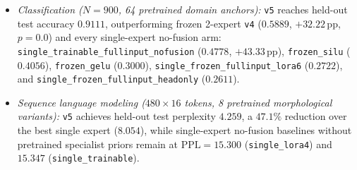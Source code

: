 \documentclass[10pt]{article}
\theoremstyle{definition}
\theoremstyle{plain}
\theoremstyle{remark}
\begin{document}
\begin{enumerate}[leftmargin=1.6em, itemsep=1pt, parsep=0pt]
    \begin{itemize}[leftmargin=1.4em, itemsep=0.5pt, parsep=0pt]
        \item \emph{Classification ($N{=}900$, 64 pretrained domain anchors):} \texttt{v5} reaches held-out test accuracy $\mathbf{0.9111}$, outperforming frozen 2-expert \texttt{v4} ($0.5889$, $+32.22\,\text{pp}$, $p{=}0.0$) and every single-expert no-fusion arm: \texttt{single\_trainable\_fullinput\_nofusion} ($0.4778$, $+43.33\,\text{pp}$), \texttt{frozen\_silu} ($0.4056$), \texttt{frozen\_gelu} ($0.3000$), \texttt{single\_frozen\_fullinput\_lora6} ($0.2722$), and \texttt{single\_frozen\_fullinput\_headonly} ($0.2611$).
        \item \emph{Sequence language modeling ($480 \times 16$ tokens, 8 pretrained morphological variants):} \texttt{v5} achieves held-out test perplexity $\mathbf{4.259}$, a $\mathbf{47.1\%}$ reduction over the best single expert ($8.054$), while single-expert no-fusion baselines without pretrained specialist priors remain at $\mathrm{PPL}=15.300$ (\texttt{single\_lora4}) and $15.347$ (\texttt{single\_trainable}).
    \end{itemize}
\end{enumerate}
\end{document}

